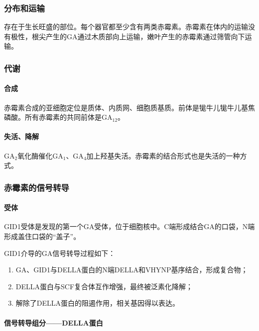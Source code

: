 \subsubsection{分布和运输}

存在于生长旺盛的部位。每个器官都至少含有两类赤霉素。赤霉素在体内的运输没有极性，根尖产生的GA通过木质部向上运输，嫩叶产生的赤霉素通过筛管向下运输。

\subsubsection{代谢}

\paragraph{合成}

赤霉素合成的亚细胞定位是质体、内质网、细胞质基质。前体是牻牛儿牻牛儿基焦磷酸。所有赤霉素的共同前体是GA$_{12}$。

\paragraph{失活、降解}

GA$_{2}$氧化酶催化GA$_{1}$、GA$_{4}$加上羟基失活。赤霉素的结合形式也是失活的一种方式。

\subsubsection{赤霉素的信号转导}

\paragraph{受体}

GID1受体是发现的第一个GA受体，位于细胞核中。C端形成结合GA的口袋，N端形成盖住口袋的“盖子”。

GID1介导的GA信号转导过程如下：

\begin{enumerate}
	\item GA、GID1与DELLA蛋白的N端DELLA和VHYNP基序结合，形成复合物；
	\item DELLA蛋白与SCF复合体互作增强，最终被泛素化降解；
	\item 解除了DELLA蛋白的阻遏作用，相关基因得以表达。
\end{enumerate}

\paragraph{信号转导组分——DELLA蛋白}


